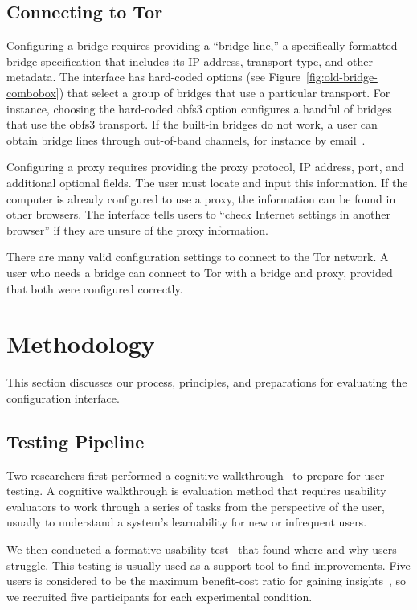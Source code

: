 \documentclass[USenglish,oneside,twocolumn]{article}
\begin{document}
\subsection{Connecting to Tor} 
Configuring a bridge requires providing a
``bridge line,'' a specifically formatted bridge specification that
includes its IP address, transport type, and other metadata.
The interface has hard-coded options (see Figure~\ref{fig:old-bridge-combobox}) 
that select a group of bridges that use a particular transport.
For instance, choosing the hard-coded obfs3 option
configures a handful of bridges that use the obfs3 transport.
If the built-in bridges do not work, a user can obtain bridge lines
through out-of-band channels, for instance by email~\cite{bridgedb}.

Configuring a proxy requires providing the proxy protocol, IP address, port, and additional optional fields. The user must locate and input this information. If the computer is already configured to use a proxy, the information can be found in other browsers. The interface tells users to ``check Internet settings in another browser'' if they are unsure of the proxy information. 

There are many valid configuration settings to connect to the Tor network.
A user who needs a bridge can connect to Tor with a bridge and proxy, provided that both were configured correctly.

\section{Methodology} 
This section discusses our process, principles, and preparations for evaluating the configuration interface.

\subsection{Testing Pipeline} 
Two researchers first performed a cognitive walkthrough~\cite{cognitive-walkthrough} to prepare for user testing. A cognitive walkthrough is evaluation method that requires usability evaluators to work through a series of tasks from the perspective of the user, usually to understand a system's learnability for new or infrequent users.

We then conducted a formative usability test~\cite{formative} that found where and why users struggle. This testing is usually used as a support tool to find improvements. Five users is considered to be the maximum benefit-cost ratio for gaining insights~\cite{howmanyusers}, so we recruited five participants for each experimental condition. 
\end{document}
